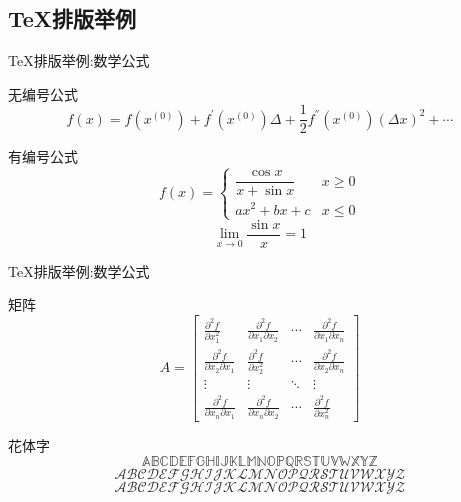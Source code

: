 \documentclass[UTF8,11pt]{beamer}
\begin{document}
\subsection{\TeX 排版举例}\label{gonshiye}
\begin{frame}{\TeX 排版举例:数学公式}
	\begin{block}{无编号公式}
		$$ f(x)=f(x^{(0)})+f^{'}(x^{(0)})\Delta +\frac{1}{2}f^{''}(x^{(0)})(\Delta x)^2+\cdots$$
	\end{block}
	
	\begin{block}{有编号公式}
		\begin{equation}\label{eq1}
			f(x) = 
			\begin{cases}
			\dfrac{\cos{x}}{x+\sin{x}} & x \geq 0 \\
							ax^2+bx+c & x \leq 0
			\end{cases}
		\end{equation}
		\begin{equation}\label{eq2}
		 \lim_{x \rightarrow 0} \frac{\sin x}{x}=1
		\end{equation}
	\end{block}
\end{frame}


\begin{frame}{\TeX 排版举例:数学公式}
	\begin{block}{矩阵}
		$$	A=\begin{bmatrix} \frac{\partial^2f }{\partial x_1^2} &\frac{\partial^2 f}{\partial x_1 \partial x_2} & \cdots & \frac{\partial^2f}{\partial x_1\partial x_n}\\ \frac{\partial^2f}{\partial x_2\partial x_1 } & \frac{\partial^2f}{\partial x_2^2}&\cdots &\frac{\partial^2f}{\partial x_2\partial x_n} \\\vdots&\vdots&\ddots & \vdots\\ \frac{\partial^2f}{\partial x_n\partial x_1}&\frac{\partial^2f}{\partial x_n \partial x_2}&\cdots&\frac{\partial^2f }{\partial x_n^2}  \end{bmatrix}$$		
	\end{block}
	\begin{block}{花体字}
		$$\mathbb{ABCDEFGHIJKLMNOPQRSTUVWXYZ}$$
		$$\mathscr{ABCDEFGHIJKLMNOPQRSTUVWXYZ}$$ 
		$$\mathcal{ABCDEFGHIJKLMNOPQRSTUVWXYZ}$$
	\end{block}
\end{frame}
\end{document}
